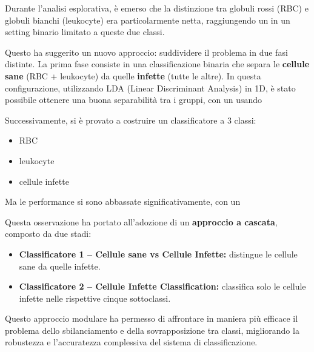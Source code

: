 \documentclass[minted, draw]{../tex/hebdomon}
\begin{document}
Durante l'analisi esplorativa, è emerso che la distinzione tra globuli rossi (RBC) e globuli bianchi (leukocyte) era particolarmente netta, raggiungendo un  in un setting binario limitato a queste due classi. 

Questo ha suggerito un nuovo approccio: suddividere il problema in due fasi distinte. La prima fase consiste in una classificazione binaria che separa le \textbf{cellule sane} (RBC + leukocyte) da quelle \textbf{infette} (tutte le altre). In questa configurazione, utilizzando LDA (Linear Discriminant Analysis) in 1D, è stato possibile ottenere una buona separabilità tra i gruppi, con un  usando 

Successivamente, si è provato a costruire un classificatore a 3 classi:
\begin{itemize}
	\item RBC
	\item leukocyte
	\item cellule infette 
\end{itemize}

Ma le performance si sono abbassate significativamente, con un  

Questa osservazione ha portato all’adozione di un \textbf{approccio a cascata}, composto da due stadi:

\begin{itemize}
	\item  \textbf{Classificatore 1 – Cellule sane vs Cellule Infette:} distingue le cellule sane da quelle infette.
	\item \textbf{Classificatore 2 – Cellule Infette Classification:} classifica solo le cellule infette nelle rispettive cinque sottoclassi.
\end{itemize}


Questo approccio modulare ha permesso di affrontare in maniera più efficace il problema dello sbilanciamento e della sovrapposizione tra classi, migliorando la robustezza e l’accuratezza complessiva del sistema di classificazione.
\end{document}
